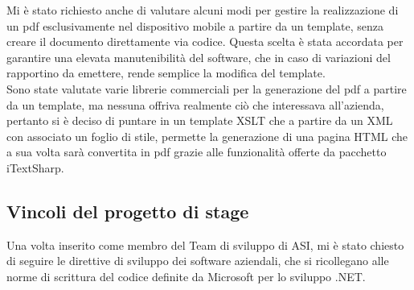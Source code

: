 Mi è stato richiesto anche di valutare alcuni modi per gestire la realizzazione di un pdf esclusivamente nel dispositivo mobile a partire da un template, senza creare il documento direttamente via codice. Questa scelta è stata accordata per garantire una elevata manutenibilità del software, che in caso di variazioni del rapportino da emettere, rende semplice la modifica del template.
\\
Sono state valutate varie librerie commerciali per la generazione del pdf a partire da un template, ma nessuna offriva realmente ciò che interessava all'azienda, pertanto si è deciso di puntare in un template XSLT che a partire da un XML con associato un foglio di stile, permette la generazione di una pagina HTML che a sua volta sarà convertita in pdf grazie alle funzionalità offerte da pacchetto iTextSharp.

\subsection{Vincoli del progetto di stage}
Una volta inserito come membro del Team di sviluppo di ASI, mi è stato chiesto di seguire le direttive di sviluppo dei software aziendali, che si ricollegano alle norme di scrittura del codice definite da Microsoft per lo sviluppo .NET.

